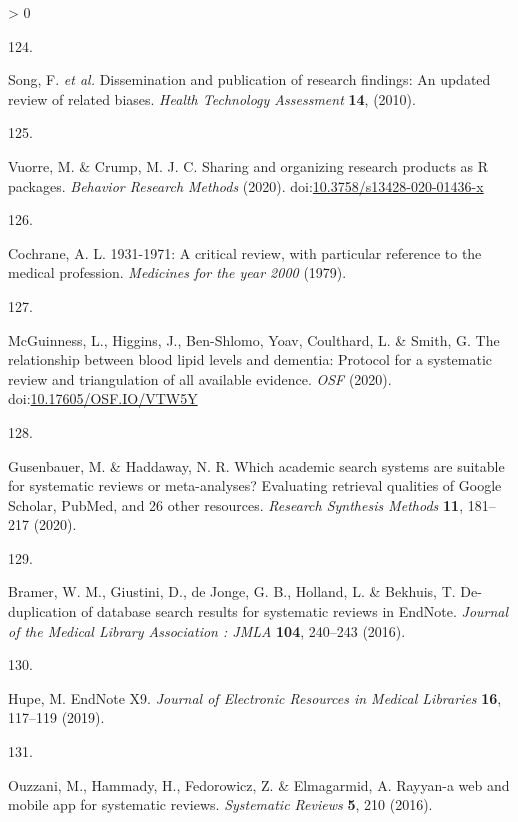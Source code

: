 \documentclass[a4paper, twoside]{templates/ociamthesis}
\newlength{\cslhangindent}
\newlength{\csllabelwidth}
\newenvironment{CSLReferences}[3] %
 {%
  \setlength{\parindent}{0pt}
  \ifodd #1 \everypar{\setlength{\hangindent}{\cslhangindent}}\ignorespaces\fi
  \ifnum #2 > 0
  \setlength{\parskip}{#2\baselineskip}
  \fi
 }%
 {}
\newcommand{\CSLLeftMargin}[1]{\parbox[t]{\maxof{\widthof{#1}}{\csllabelwidth}}{#1}}
\newcommand{\CSLRightInline}[1]{\parbox[t]{\linewidth - \csllabelwidth}{#1}}
\begin{document}
\begin{CSLReferences}{0}{0}
\leavevmode\hypertarget{ref-song2010}{}%
\CSLLeftMargin{124. }
\CSLRightInline{Song, F. \emph{et al.} Dissemination and publication of research findings: An updated review of related biases. \emph{Health Technology Assessment} \textbf{14}, (2010).}

\leavevmode\hypertarget{ref-vuorre2020}{}%
\CSLLeftMargin{125. }
\CSLRightInline{Vuorre, M. \& Crump, M. J. C. Sharing and organizing research products as {R} packages. \emph{Behavior Research Methods} (2020). doi:\href{https://doi.org/10.3758/s13428-020-01436-x}{10.3758/s13428-020-01436-x}}

\leavevmode\hypertarget{ref-cochrane1979}{}%
\CSLLeftMargin{126. }
\CSLRightInline{Cochrane, A. L. 1931-1971: A critical review, with particular reference to the medical profession. \emph{Medicines for the year 2000} (1979).}

\leavevmode\hypertarget{ref-mcguinnessluke2020}{}%
\CSLLeftMargin{127. }
\CSLRightInline{McGuinness, L., Higgins, J., Ben-Shlomo, Yoav, Coulthard, L. \& Smith, G. The relationship between blood lipid levels and dementia: Protocol for a systematic review and triangulation of all available evidence. \emph{OSF} (2020). doi:\href{https://doi.org/10.17605/OSF.IO/VTW5Y}{10.17605/OSF.IO/VTW5Y}}

\leavevmode\hypertarget{ref-gusenbauer2020a}{}%
\CSLLeftMargin{128. }
\CSLRightInline{Gusenbauer, M. \& Haddaway, N. R. Which academic search systems are suitable for systematic reviews or meta-analyses? Evaluating retrieval qualities of {Google Scholar}, {PubMed}, and 26 other resources. \emph{Research Synthesis Methods} \textbf{11}, 181--217 (2020).}

\leavevmode\hypertarget{ref-bramer2016}{}%
\CSLLeftMargin{129. }
\CSLRightInline{Bramer, W. M., Giustini, D., de Jonge, G. B., Holland, L. \& Bekhuis, T. De-duplication of database search results for systematic reviews in {EndNote}. \emph{Journal of the Medical Library Association : JMLA} \textbf{104}, 240--243 (2016).}

\leavevmode\hypertarget{ref-hupe2019}{}%
\CSLLeftMargin{130. }
\CSLRightInline{Hupe, M. {EndNote X9}. \emph{Journal of Electronic Resources in Medical Libraries} \textbf{16}, 117--119 (2019).}

\leavevmode\hypertarget{ref-ouzzani2016}{}%
\CSLLeftMargin{131. }
\CSLRightInline{Ouzzani, M., Hammady, H., Fedorowicz, Z. \& Elmagarmid, A. Rayyan-a web and mobile app for systematic reviews. \emph{Systematic Reviews} \textbf{5}, 210 (2016).}


\end{CSLReferences}
\end{document}
